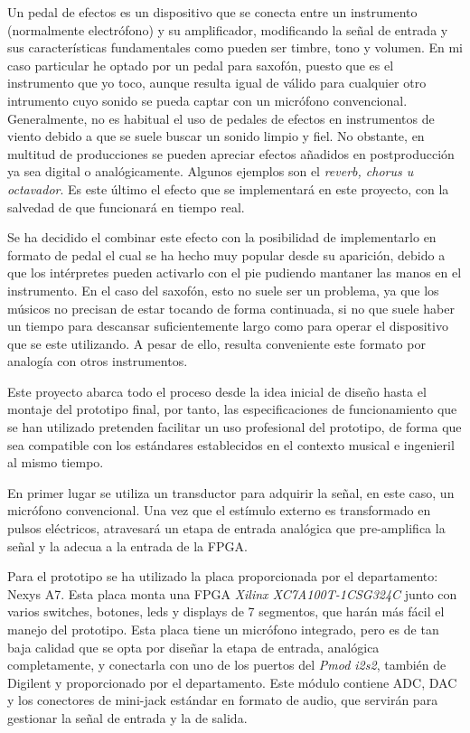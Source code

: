 Un pedal de efectos es un dispositivo que se conecta entre un instrumento (normalmente electrófono) y su amplificador, modificando la señal de entrada y sus características fundamentales como pueden ser timbre, tono y volumen. En mi caso particular he optado por un pedal para saxofón, puesto que es el instrumento que yo toco, aunque resulta igual de válido para cualquier otro intrumento cuyo sonido se pueda captar con un micrófono convencional. Generalmente, no es habitual el uso de pedales de efectos en instrumentos de viento debido a que se suele buscar un sonido limpio y fiel. No obstante, en multitud de producciones se pueden apreciar efectos añadidos en postproducción ya sea digital o analógicamente. Algunos ejemplos son el \emph{reverb, chorus u octavador}. Es este último el efecto que se implementará en este proyecto, con la salvedad de que funcionará en tiempo real. 

Se ha decidido el combinar este efecto con la posibilidad de implementarlo en formato de pedal el cual se ha hecho muy popular desde su aparición, debido a que los intérpretes pueden activarlo con el pie pudiendo mantaner las manos en el instrumento. En el caso del saxofón, esto no suele ser un problema, ya que los músicos no precisan de estar tocando de forma continuada, si no que suele haber un tiempo para descansar suficientemente largo como para operar el dispositivo que se este utilizando. A pesar de ello, resulta conveniente este formato por analogía con otros instrumentos.

Este proyecto abarca todo el proceso desde la idea inicial de diseño hasta el montaje del prototipo final, por tanto, las especificaciones de funcionamiento que se han utilizado pretenden facilitar un uso profesional del prototipo, de forma que sea compatible con los estándares establecidos en el contexto musical e ingenieril al mismo tiempo.

En primer lugar se utiliza un transductor para adquirir la señal, en este caso, un micrófono convencional. Una vez que el estímulo externo es transformado en pulsos eléctricos, atravesará un etapa de entrada analógica que pre-amplifica la señal y la adecua a la entrada de la FPGA.

Para el prototipo se ha utilizado la placa proporcionada por el departamento: Nexys A7. Esta placa monta una FPGA \emph{Xilinx XC7A100T-1CSG324C} junto con varios switches, botones, leds y displays de 7 segmentos, que harán más fácil el manejo del prototipo. Esta placa tiene un micrófono integrado, pero es de tan baja calidad que se opta por diseñar la etapa de entrada, analógica completamente, y conectarla con uno de los puertos del \emph{Pmod i2s2}, también de Digilent y proporcionado por el departamento. Este módulo contiene ADC, DAC y los conectores de mini-jack estándar en formato de audio, que servirán para gestionar la señal de entrada y la de salida.

